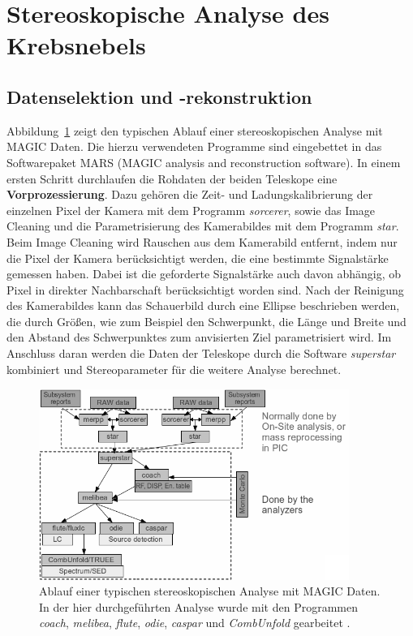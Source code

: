 \section{Stereoskopische Analyse des Krebsnebels}
\label{sec:analyse}

\subsection{Datenselektion und -rekonstruktion}

Abbildung~\ref{fig:analysischain} zeigt den typischen Ablauf einer
stereoskopischen Analyse mit MAGIC Daten. Die hierzu verwendeten Programme sind
eingebettet in das Softwarepaket MARS (MAGIC analysis and reconstruction
software). In einem ersten Schritt durchlaufen die
Rohdaten der beiden Teleskope eine \textbf{Vorprozessierung}. Dazu gehören die
Zeit- und Ladungskalibrierung der einzelnen Pixel der Kamera mit dem Programm
\textit{sorcerer}, sowie das Image Cleaning und die Parametrisierung des
Kamerabildes mit dem Programm \textit{star}. Beim Image Cleaning wird Rauschen
aus dem Kamerabild entfernt, indem nur die Pixel der Kamera berücksichtigt
werden, die eine bestimmte Signalstärke gemessen haben. Dabei ist die geforderte
Signalstärke auch davon abhängig, ob Pixel in direkter Nachbarschaft
berücksichtigt worden sind. Nach der Reinigung des Kamerabildes kann das
Schauerbild durch eine Ellipse beschrieben werden, die durch Größen, wie zum
Beispiel den Schwerpunkt, die Länge und Breite und den Abstand des Schwerpunktes
zum anvisierten Ziel parametrisiert wird. Im Anschluss daran werden die Daten
der Teleskope durch die Software \textit{superstar} kombiniert und
Stereoparameter für die weitere Analyse berechnet.

\begin{figure}[H]
  \centering
  \includegraphics[width=0.9\textwidth]{figures/analysischain.png}
  \caption{Ablauf einer typischen stereoskopischen Analyse mit MAGIC Daten. In
  der hier durchgeführten Analyse wurde mit den Programmen \textit{coach},
  \textit{melibea}, \textit{flute}, \textit{odie}, \textit{caspar} und
  \textit{CombUnfold} gearbeitet \cite{magic_wiki}.} %
  \label{fig:analysischain}
\end{figure}

